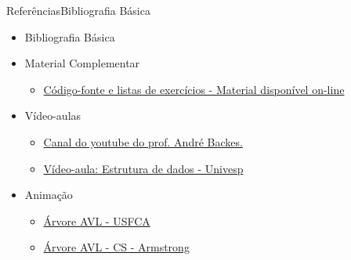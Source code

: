 \documentclass[aspectratio=169]{beamer}
\begin{document}

\begin{frame}{Referências}{Bibliografia Básica}
\begin{itemize}
\item Bibliografia Básica


\item Material Complementar
\begin{itemize}
\item \href{https://programacaodescomplicada.wordpress.com/complementar/}{Código-fonte e listas de exercícios - Material disponível on-line}
\end{itemize}
\item Vídeo-aulas
\begin{itemize}
\item \href{https://www.youtube.com/watch?v=Au-6c55J90c&index=78&list=PL8iN9FQ7_jt6H5m4Gm0H89sybzR9yaaka}{Canal do youtube do prof. André Backes.}
\item \href{https://www.youtube.com/watch?v=YkF76cOgtMQ&t=92s}{Vídeo-aula: Estrutura de dados - Univesp}
\end{itemize}
\item Animação
\begin{itemize}
\item \href{https://www.cs.usfca.edu/~galles/visualization/AVLtree.html}{Árvore AVL - USFCA}
\item \href{http://www.cs.armstrong.edu/liang/animation/web/AVLTree.html}{Árvore AVL - CS - Armstrong}
\end{itemize}
\end{itemize}
\end{frame}

\begin{frame}[plain]
  \titlepage
\end{frame}
\end{document}
